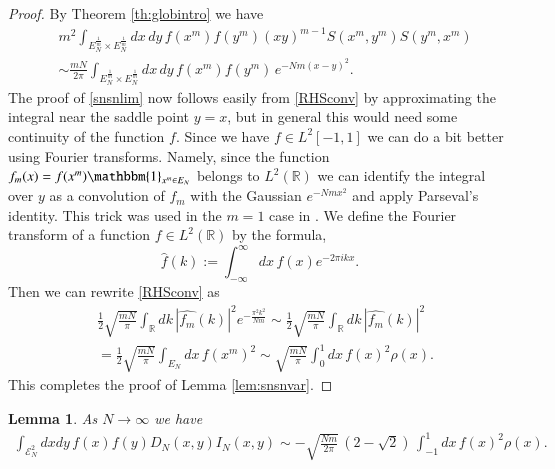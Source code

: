 \documentclass[11pt,reqno]{amsproc}
\newtheorem{lemma}[theorem]{Lemma}
\numberwithin{equation}{section}
\numberwithin{theorem}{section}
\begin{document}
\begin{proof}
By Theorem \ref{th:globintro} we have
\begin{align}
&m^{2}\int_{E_{N}^{\frac{1}{m}}\times E_{N}^{\frac{1}{m}}}dx\,dy\,f(x^{m})f(y^{m})(xy)^{m-1}S(x^{m},y^{m})S(y^{m},x^{m})\\
&\sim \frac{mN}{2\pi}\int_{E_{N}^{\frac{1}{m}}\times E_{N}^{\frac{1}{m}}}dx\,dy\,f(x^{m})f(y^{m})\,e^{-Nm(x-y)^{2}}. \label{RHSconv}
\end{align}
The proof of \eqref{snsnlim} now follows easily from \eqref{RHSconv} by approximating the integral near the saddle point $y=x$, but in general this would need some continuity of the function $f$. Since we have $f \in L^{2}[-1,1]$ we can do a bit better using Fourier transforms. Namely, since the function $f_{m}(x) = f(x^{m})\mathbbm{1}_{x^{m}\in E_{N}}$ belongs to $L^{2}(\mathbb{R})$ we can identify the integral over $y$ as a convolution of $f_{m}$ with the Gaussian $e^{-Nmx^{2}}$ and apply Parseval's identity. This trick was used in the $m=1$ case in \cite{K15}. We define the Fourier transform of a function $f \in L^{2}(\mathbb{R})$ by the formula, 
\begin{equation}
\hat{f}(k) := \int_{-\infty}^{\infty}dx\,f(x)e^{-2\pi i k x}.
\end{equation}
Then we can rewrite \eqref{RHSconv} as
\begin{align}
&\frac{1}{2}\sqrt{\frac{mN}{\pi}}\int_{\mathbb{R}}dk\,|\hat{f_{m}}(k)|^{2}e^{-\frac{\pi^{2}k^{2}}{Nm}}\sim \frac{1}{2}\sqrt{\frac{mN}{\pi}}\int_{\mathbb{R}}dk\,|\hat{f_{m}}(k)|^{2}\\
&= \frac{1}{2}\sqrt{\frac{mN}{\pi}}\int_{E_{N}}dx\,f(x^{m})^{2} \sim \sqrt{\frac{mN}{\pi}}\int_{0}^{1}dx\,f(x)^{2}\rho(x).
\end{align} 
This completes the proof of Lemma \ref{lem:snsnvar}.
\end{proof}

\begin{lemma}
\label{lem:dninvar}
As $N \to \infty$ we have
\begin{equation}
\begin{split}
\int_{\mathcal{E}_{N}^{2}}dxdy\,f(x)f(y)D_{N}(x,y)I_{N}(x,y)\sim -\sqrt{\frac{Nm}{2\pi}}\,(2-\sqrt{2})\,\int_{-1}^{1}dx\,f(x)^{2}\rho(x).
\end{split}
\end{equation}
\end{lemma}
\end{document}
